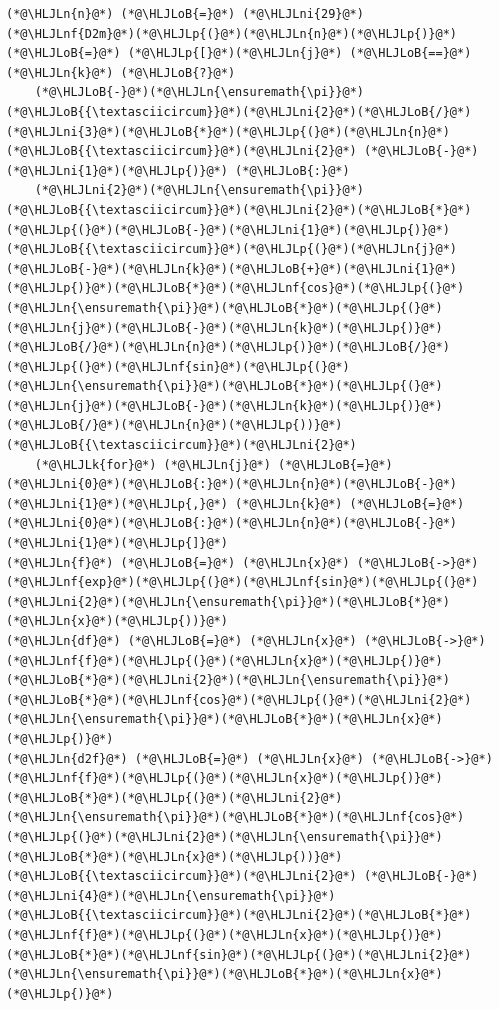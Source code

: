 \documentclass[12pt,a4paper]{article}
\newcommand{\HLJLk}[1]{\textcolor[RGB]{148,91,176}{\textbf{#1}}}
\newcommand{\HLJLn}[1]{#1}
\newcommand{\HLJLnf}[1]{\textcolor[RGB]{66,102,213}{#1}}
\newcommand{\HLJLni}[1]{\textcolor[RGB]{59,151,46}{#1}}
\newcommand{\HLJLoB}[1]{\textcolor[RGB]{102,102,102}{\textbf{#1}}}
\newcommand{\HLJLp}[1]{#1}
\begin{document}
\begin{lstlisting}
(*@\HLJLn{n}@*) (*@\HLJLoB{=}@*) (*@\HLJLni{29}@*)
(*@\HLJLnf{D2m}@*)(*@\HLJLp{(}@*)(*@\HLJLn{n}@*)(*@\HLJLp{)}@*) (*@\HLJLoB{=}@*) (*@\HLJLp{[}@*)(*@\HLJLn{j}@*) (*@\HLJLoB{==}@*) (*@\HLJLn{k}@*) (*@\HLJLoB{?}@*) 
    (*@\HLJLoB{-}@*)(*@\HLJLn{\ensuremath{\pi}}@*)(*@\HLJLoB{{\textasciicircum}}@*)(*@\HLJLni{2}@*)(*@\HLJLoB{/}@*)(*@\HLJLni{3}@*)(*@\HLJLoB{*}@*)(*@\HLJLp{(}@*)(*@\HLJLn{n}@*)(*@\HLJLoB{{\textasciicircum}}@*)(*@\HLJLni{2}@*) (*@\HLJLoB{-}@*) (*@\HLJLni{1}@*)(*@\HLJLp{)}@*) (*@\HLJLoB{:}@*) 
    (*@\HLJLni{2}@*)(*@\HLJLn{\ensuremath{\pi}}@*)(*@\HLJLoB{{\textasciicircum}}@*)(*@\HLJLni{2}@*)(*@\HLJLoB{*}@*)(*@\HLJLp{(}@*)(*@\HLJLoB{-}@*)(*@\HLJLni{1}@*)(*@\HLJLp{)}@*)(*@\HLJLoB{{\textasciicircum}}@*)(*@\HLJLp{(}@*)(*@\HLJLn{j}@*)(*@\HLJLoB{-}@*)(*@\HLJLn{k}@*)(*@\HLJLoB{+}@*)(*@\HLJLni{1}@*)(*@\HLJLp{)}@*)(*@\HLJLoB{*}@*)(*@\HLJLnf{cos}@*)(*@\HLJLp{(}@*)(*@\HLJLn{\ensuremath{\pi}}@*)(*@\HLJLoB{*}@*)(*@\HLJLp{(}@*)(*@\HLJLn{j}@*)(*@\HLJLoB{-}@*)(*@\HLJLn{k}@*)(*@\HLJLp{)}@*)(*@\HLJLoB{/}@*)(*@\HLJLn{n}@*)(*@\HLJLp{)}@*)(*@\HLJLoB{/}@*)(*@\HLJLp{(}@*)(*@\HLJLnf{sin}@*)(*@\HLJLp{(}@*)(*@\HLJLn{\ensuremath{\pi}}@*)(*@\HLJLoB{*}@*)(*@\HLJLp{(}@*)(*@\HLJLn{j}@*)(*@\HLJLoB{-}@*)(*@\HLJLn{k}@*)(*@\HLJLp{)}@*)(*@\HLJLoB{/}@*)(*@\HLJLn{n}@*)(*@\HLJLp{))}@*)(*@\HLJLoB{{\textasciicircum}}@*)(*@\HLJLni{2}@*) 
    (*@\HLJLk{for}@*) (*@\HLJLn{j}@*) (*@\HLJLoB{=}@*) (*@\HLJLni{0}@*)(*@\HLJLoB{:}@*)(*@\HLJLn{n}@*)(*@\HLJLoB{-}@*)(*@\HLJLni{1}@*)(*@\HLJLp{,}@*) (*@\HLJLn{k}@*) (*@\HLJLoB{=}@*) (*@\HLJLni{0}@*)(*@\HLJLoB{:}@*)(*@\HLJLn{n}@*)(*@\HLJLoB{-}@*)(*@\HLJLni{1}@*)(*@\HLJLp{]}@*)
(*@\HLJLn{f}@*) (*@\HLJLoB{=}@*) (*@\HLJLn{x}@*) (*@\HLJLoB{->}@*) (*@\HLJLnf{exp}@*)(*@\HLJLp{(}@*)(*@\HLJLnf{sin}@*)(*@\HLJLp{(}@*)(*@\HLJLni{2}@*)(*@\HLJLn{\ensuremath{\pi}}@*)(*@\HLJLoB{*}@*)(*@\HLJLn{x}@*)(*@\HLJLp{))}@*)
(*@\HLJLn{df}@*) (*@\HLJLoB{=}@*) (*@\HLJLn{x}@*) (*@\HLJLoB{->}@*) (*@\HLJLnf{f}@*)(*@\HLJLp{(}@*)(*@\HLJLn{x}@*)(*@\HLJLp{)}@*)(*@\HLJLoB{*}@*)(*@\HLJLni{2}@*)(*@\HLJLn{\ensuremath{\pi}}@*)(*@\HLJLoB{*}@*)(*@\HLJLnf{cos}@*)(*@\HLJLp{(}@*)(*@\HLJLni{2}@*)(*@\HLJLn{\ensuremath{\pi}}@*)(*@\HLJLoB{*}@*)(*@\HLJLn{x}@*)(*@\HLJLp{)}@*)
(*@\HLJLn{d2f}@*) (*@\HLJLoB{=}@*) (*@\HLJLn{x}@*) (*@\HLJLoB{->}@*) (*@\HLJLnf{f}@*)(*@\HLJLp{(}@*)(*@\HLJLn{x}@*)(*@\HLJLp{)}@*)(*@\HLJLoB{*}@*)(*@\HLJLp{(}@*)(*@\HLJLni{2}@*)(*@\HLJLn{\ensuremath{\pi}}@*)(*@\HLJLoB{*}@*)(*@\HLJLnf{cos}@*)(*@\HLJLp{(}@*)(*@\HLJLni{2}@*)(*@\HLJLn{\ensuremath{\pi}}@*)(*@\HLJLoB{*}@*)(*@\HLJLn{x}@*)(*@\HLJLp{))}@*)(*@\HLJLoB{{\textasciicircum}}@*)(*@\HLJLni{2}@*) (*@\HLJLoB{-}@*) (*@\HLJLni{4}@*)(*@\HLJLn{\ensuremath{\pi}}@*)(*@\HLJLoB{{\textasciicircum}}@*)(*@\HLJLni{2}@*)(*@\HLJLoB{*}@*)(*@\HLJLnf{f}@*)(*@\HLJLp{(}@*)(*@\HLJLn{x}@*)(*@\HLJLp{)}@*)(*@\HLJLoB{*}@*)(*@\HLJLnf{sin}@*)(*@\HLJLp{(}@*)(*@\HLJLni{2}@*)(*@\HLJLn{\ensuremath{\pi}}@*)(*@\HLJLoB{*}@*)(*@\HLJLn{x}@*)(*@\HLJLp{)}@*)

\end{lstlisting}
\end{document}
